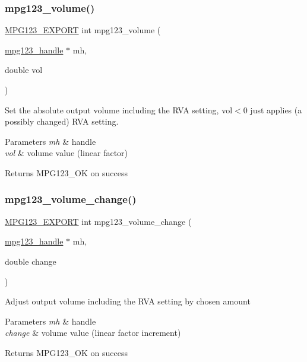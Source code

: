 \subsubsection{\texorpdfstring{mpg123\_volume()}{mpg123\_volume()}}
{\footnotesize\ttfamily \mbox{\hyperlink{mpg123_8h_a2ba98cfba3f760879df70e755b2a61cc}{M\+P\+G123\+\_\+\+E\+X\+P\+O\+RT}} int mpg123\+\_\+volume (\begin{DoxyParamCaption}\item[{\mbox{\hyperlink{group__mpg123__init_ga6728e2839a395f3a07d4514da659faca}{mpg123\+\_\+handle}} $\ast$}]{mh,  }\item[{double}]{vol }\end{DoxyParamCaption})}

Set the absolute output volume including the R\+VA setting, vol$<$0 just applies (a possibly changed) R\+VA setting. 
\begin{DoxyParams}{Parameters}
{\em mh} & handle \\
\hline
{\em vol} & volume value (linear factor) \\
\hline
\end{DoxyParams}
\begin{DoxyReturn}{Returns}
M\+P\+G123\+\_\+\+OK on success 
\end{DoxyReturn}
\mbox{\label{group__mpg123__voleq_gaa0897be03a78daf11e28c0e7263a0ae1}} 
\subsubsection{\texorpdfstring{mpg123\_volume\_change()}{mpg123\_volume\_change()}}
{\footnotesize\ttfamily \mbox{\hyperlink{mpg123_8h_a2ba98cfba3f760879df70e755b2a61cc}{M\+P\+G123\+\_\+\+E\+X\+P\+O\+RT}} int mpg123\+\_\+volume\+\_\+change (\begin{DoxyParamCaption}\item[{\mbox{\hyperlink{group__mpg123__init_ga6728e2839a395f3a07d4514da659faca}{mpg123\+\_\+handle}} $\ast$}]{mh,  }\item[{double}]{change }\end{DoxyParamCaption})}

Adjust output volume including the R\+VA setting by chosen amount 
\begin{DoxyParams}{Parameters}
{\em mh} & handle \\
\hline
{\em change} & volume value (linear factor increment) \\
\hline
\end{DoxyParams}
\begin{DoxyReturn}{Returns}
M\+P\+G123\+\_\+\+OK on success 
\end{DoxyReturn}
